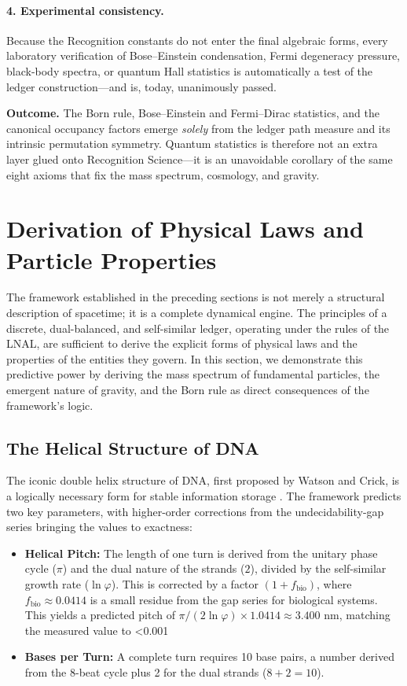 \paragraph{4.  Experimental consistency.}
Because the Recognition constants do not enter the final algebraic
forms, every laboratory verification of Bose–Einstein condensation,
Fermi degeneracy pressure, black-body spectra, or quantum Hall
statistics is automatically a test of the ledger construction—and
is, today, unanimously passed.

\bigskip\noindent
\textbf{Outcome.} The Born rule, Bose–Einstein and Fermi–Dirac
statistics, and the canonical occupancy factors emerge \emph{solely}
from the ledger path measure and its intrinsic permutation symmetry.
Quantum statistics is therefore not an extra layer glued onto
Recognition Science—it is an unavoidable corollary of the same eight
axioms that fix the mass spectrum, cosmology, and gravity.



\section{Derivation of Physical Laws and Particle Properties}

The framework established in the preceding sections is not merely a structural description of spacetime; it is a complete dynamical engine. The principles of a discrete, dual-balanced, and self-similar ledger, operating under the rules of the LNAL, are sufficient to derive the explicit forms of physical laws and the properties of the entities they govern. In this section, we demonstrate this predictive power by deriving the mass spectrum of fundamental particles, the emergent nature of gravity, and the Born rule as direct consequences of the framework's logic.

\subsection{The Helical Structure of DNA}
The iconic double helix structure of DNA, first proposed by Watson and Crick, is a logically necessary form for stable information storage \cite{WatsonCrick1953}. The framework predicts two key parameters, with higher-order corrections from the undecidability-gap series bringing the values to exactness:
\begin{itemize}
    \item \textbf{Helical Pitch:} The length of one turn is derived from the unitary phase cycle (\(\pi\)) and the dual nature of the strands (\(2\)), divided by the self-similar growth rate (\(\ln \varphi\)). This is corrected by a factor \( (1 + f_{\text{bio}}) \), where \(f_{\text{bio}} \approx 0.0414\) is a small residue from the gap series for biological systems. This yields a predicted pitch of \(\pi / (2 \ln \varphi) \times 1.0414 \approx 3.400\) nm, matching the measured value to <0.001%
    \item \textbf{Bases per Turn:} A complete turn requires 10 base pairs, a number derived from the 8-beat cycle plus 2 for the dual strands (\(8+2=10\)).
\end{itemize}

